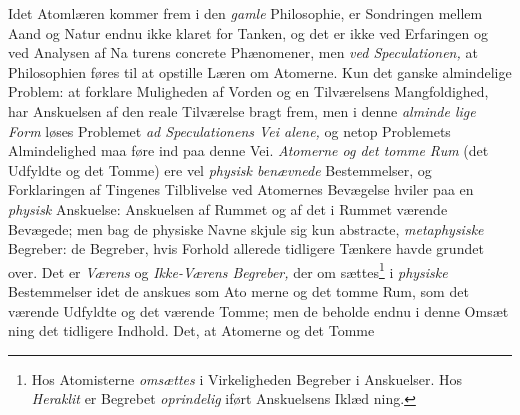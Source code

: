 Idet Atomlæren kommer frem i den \emph{gamle} Philosophie,
er Sondringen mellem Aand og Natur endnu ikke klaret for
Tanken, og det er ikke ved Erfaringen og ved Analysen af Na\-%
turens concrete Phænomener, men \emph{ved Speculationen,} at
Philosophien føres til at opstille Læren om Atomerne. Kun
det ganske almindelige Problem: at forklare Muligheden af
Vorden og en Tilværelsens Mangfoldighed, har Anskuelsen af
den reale Tilværelse bragt frem, men i denne \emph{alminde\-%
lige Form} løses Problemet \emph{ad Speculationens Vei alene,}
og netop Problemets Almindelighed maa føre ind paa denne
Vei. \emph{Atomerne og det tomme Rum} (det Udfyldte og det
Tomme) ere vel \emph{physisk benævnede} Bestemmelser, og
Forklaringen af Tingenes Tilblivelse ved Atomernes Bevægelse
hviler paa en \emph{physisk} Anskuelse: Anskuelsen af Rummet og
af det i Rummet værende Bevægede; men bag de physiske
Navne skjule sig kun abstracte, \emph{metaphysiske} Begreber: de
Begreber, hvis Forhold allerede tidligere Tænkere havde grundet
over. Det er \emph{Værens} og \emph{Ikke-Værens Begreber,} der om\-%
sættes\footnote{Hos Atomisterne \emph{omsættes} i Virkeligheden Begreber i Anskuelser.
Hos \emph{Heraklit} er Begrebet \emph{oprindelig} iført Anskuelsens Iklæd\-%
ning.} i \emph{physiske} Bestemmelser idet de anskues som Ato\-%
merne og det tomme Rum, som det værende Udfyldte og det
værende Tomme; men de beholde endnu i denne Omsæt\-%
ning det tidligere Indhold. Det, at Atomerne og det Tomme
